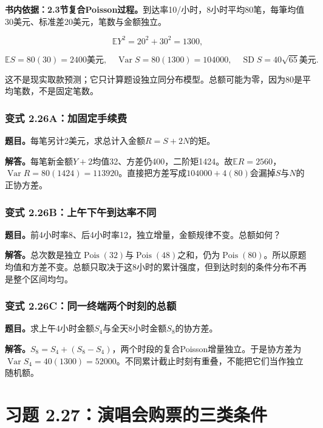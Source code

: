 \documentclass[12pt,a4paper,UTF8,fontset=fandol]{ctexart}
\begin{document}
\textbf{书内依据：2.3节复合Poisson过程。}到达率10/小时，8小时平均80笔，每筆均值30美元、标准差20美元，笔数与金额独立。

\[
\mathbb EY^2=20^2+30^2=1300,
\]

\[\boxed{\mathbb ES=80(30)=2400\text{美元},\quad
\operatorname{Var}S=80(1300)=104000,\quad
\operatorname{SD}S=40\sqrt{65}\text{美元}.}\]

这不是现实取款预测；它只计算题设独立同分布模型。总额可能为零，因为80是平均笔数，不是固定笔数。

\subsubsection{变式
2.26A：加固定手续费}\label{ux53d8ux5f0f-2.26aux52a0ux56faux5b9aux624bux7eedux8d39}

\textbf{题目。}每笔另计2美元，求总计入金额\(R=S+2N\)的矩。

\textbf{解答。}每笔新金额\(Y+2\)均值32、方差仍400，二阶矩1424。故\(\mathbb ER=2560\)，\(\operatorname{Var}R=80(1424)=113920\)。直接把方差写成\(104000+4(80)\)会漏掉\(S\)与\(N\)的正协方差。

\subsubsection{变式
2.26B：上午下午到达率不同}\label{ux53d8ux5f0f-2.26bux4e0aux5348ux4e0bux5348ux5230ux8fbeux7387ux4e0dux540c}

\textbf{题目。}前4小时率8、后4小时率12，独立增量，金额规律不变。总额如何？

\textbf{解答。}总次数是独立\(\operatorname{Pois}(32)\)与\(\operatorname{Pois}(48)\)之和，仍为\(\operatorname{Pois}(80)\)。所以原题均值和方差不变。总额只取决于这8小时的累计强度，但到达时刻的条件分布不再是整个区间均匀。

\subsubsection{变式
2.26C：同一终端两个时刻的总额}\label{ux53d8ux5f0f-2.26cux540cux4e00ux7ec8ux7aefux4e24ux4e2aux65f6ux523bux7684ux603bux989d}

\textbf{题目。}求上午4小时金额\(S_4\)与全天8小时金额\(S_8\)的协方差。

\textbf{解答。}\(S_8=S_4+(S_8-S_4)\)，两个时段的复合Poisson增量独立。于是协方差为\(\operatorname{Var}S_4=40(1300)=52000\)。不同累计截止时刻有重叠，不能把它们当作独立随机额。

\section{习题
2.27：演唱会购票的三类条件}\label{ux4e60ux9898-2.27ux6f14ux5531ux4f1aux8d2dux7968ux7684ux4e09ux7c7bux6761ux4ef6}
\end{document}

